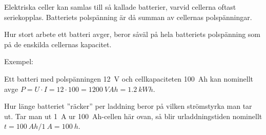 Elektriska celler kan samlas till så kallade batterier, varvid cellerna oftast
seriekopplas.
Batteriets polspänning är då summan av cellernas polspänningar.

Hur stort arbete ett batteri avger, beror såväl på hela batteriets
polspänning som på de enskilda cellernas kapacitet.

Exempel:

Ett batteri med polspänningen \SI{12}{V} och cellkapaciteten
\SI{100}{Ah} kan nominellt avge
\(P = U \cdot I = 12 \cdot 100 = \SI{1200}{VAh} = \SI{1,2}{kWh}\).


Hur länge batteriet ''räcker'' per laddning beror på vilken
strömstyrka man tar ut.
Tar man ut \SI{1}{A} ur \SI{100}{Ah}-cellen här ovan, så blir
urladdningstiden nominellt \(t = \SI{100}{Ah} / \SI{1}{A} = \SI{100}{h}\).
